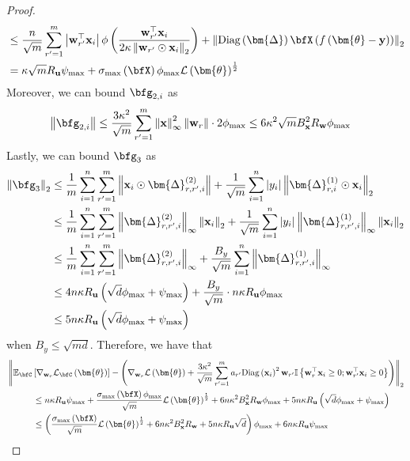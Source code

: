 \documentclass[10pt]{article} %
\theoremstyle{definition}
\theoremstyle{plain}
\newcommand{\paren}[1]{\left(#1\right)}
\newcommand{\norm}[1]{\left\|#1\right\|}
\providecommand{\E}{\mathbb{E}}
\def\calL{{\mathcal{L}}}
\def\bfu{{\mathbf{u}}}\def\bfv{{\mathbf{v}}}\def\bfw{{\mathbf{w}}}\def\bfx{{\mathbf{x}}}
\def\bfy{{\mathbf{y}}}\def\bfz{{\mathbf{z}}}
\begin{document}
\begin{proof}
\begin{align*}
        & \leq \frac{n}{\sqrt{m}}\sum_{r'=1}^m\left|\bfw_{r'}^\top\bfx_i\right|\phi\paren{\frac{\bfw_{r'}^\top\bfx_i}{2\kappa\norm{\bfw_{r'}\odot\bfx_i}_2}} + \norm{\text{Diag}\paren{\bm{\Delta}}\bfX\paren{f\paren{\bm{\theta} - \bfy}}}_2\\
        & = \kappa\sqrt{m}R_{\bfu}\psi_{\max} + \sigma_{\max}\paren{\bfX}\phi_{\max}\calL\paren{\bm{\theta}}^{\frac{1}{2}}
    \end{align*}
    Moreover, we can bound $\bfg_{2,i}$ as
    \begin{align*}
        \norm{\bfg_{2,i}} & \leq \frac{3\kappa^2}{\sqrt{m}}\sum_{r'=1}^m\norm{\bfx}_{\infty}^2\norm{\bfw_r}\cdot 2\phi_{\max}\leq 6\kappa^2\sqrt{m}B_{\bfx}^2R_{\bfw}\phi_{\max}
    \end{align*}
    Lastly, we can bound $\bfg_{3}$ as
    \begin{align*}
        \norm{\bfg_{3}}_2 & \leq \frac{1}{m}\sum_{i=1}^n\sum_{r'=1}^m\norm{\bfx_i\odot \bm{\Delta}_{r,r',i}^{(2)}} + \frac{1}{\sqrt{m}}\sum_{i=1}^n\left|y_i\right|\norm{\bm{\Delta}^{(1)}_{r,i}\odot\bfx_i}_2\\
        & \leq \frac{1}{m}\sum_{i=1}^n\sum_{r'=1}^m\norm{\bm{\Delta}_{r,r',i}^{(2)}}_{\infty}\norm{\bfx_i}_2 + \frac{1}{\sqrt{m}}\sum_{i=1}^n\left|y_i\right|\norm{\bm{\Delta}_{r,r',i}^{(1)}}_{\infty}\norm{\bfx_i}_2\\
        & \leq \frac{1}{m}\sum_{i=1}^n\sum_{r'=1}^m\norm{\bm{\Delta}_{r,r',i}^{(2)}}_{\infty} + \frac{B_y}{\sqrt{m}}\sum_{i=1}^n\norm{\bm{\Delta}_{r,r',i}^{(1)}}_{\infty}\\
        & \leq 4n\kappa R_{\bfu}\paren{\sqrt{d}\phi_{\max} + \psi_{\max}} + \frac{B_y}{\sqrt{m}}\cdot n\kappa R_{\bfu}\phi_{\max}\\
        & \leq 5n\kappa R_{\bfu}\paren{\sqrt{d}\phi_{\max} + \psi_{\max}}
    \end{align*}
    when $B_y \leq \sqrt{md}$. Therefore, we have that
    \begin{align*}
        & \norm{\E_{\bfC}\left[\nabla_{\bfw_r}\calL_{\bfC}\paren{\bm{\theta}}\right] - \paren{\nabla_{\bfw_r}\calL\paren{\bm{\theta}} + \frac{3\kappa^2}{\sqrt{m}}\sum_{r'=1}^ma_{r'}\text{Diag}\paren{\bfx_i}^2\bfw_{r'}\mathbb{I}\left\{\bfw_{r}^\top\bfx_i\geq 0;\bfw_{r'}^\top\bfx_i\geq 0\right\}}}_2 \\
        & \quad\quad\quad \leq n\kappa R_{\bfu}\psi_{\max} + \frac{\sigma_{\max}\paren{\bfX}\phi_{\max}}{\sqrt{m}}\calL\paren{\bm{\theta}}^{\frac{1}{2}} + 6n\kappa^2B_{\bfx}^2R_{\bfw}\phi_{\max} + 5n\kappa R_{\bfu}\paren{\sqrt{d}\phi_{\max} + \psi_{\max}}\\
        & \quad\quad\quad \leq \paren{\frac{\sigma_{\max}\paren{\bfX}}{\sqrt{m}}\calL\paren{\bm{\theta}}^{\frac{1}{2}} + 6n\kappa^2B_{\bfx}^2R_{\bfw} + 5n\kappa R_{\bfu}\sqrt{d}}\phi_{\max} + 6n\kappa R_{\bfu}\psi_{\max}
    \end{align*}
\end{proof}
\end{document}
